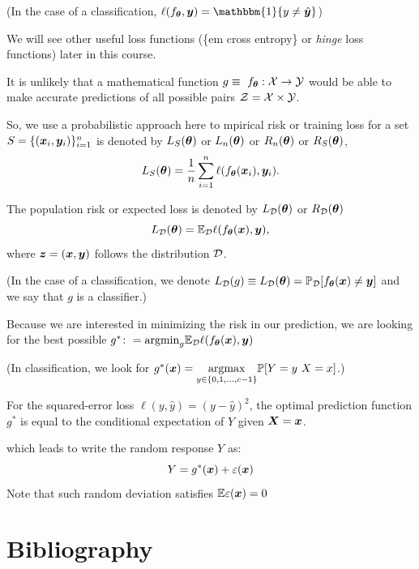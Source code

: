 \documentclass{beamer}
\begin{document}
\begin{frame}[allowframebreaks]
  (In the case of a classification, $\ell(f_{\vtheta},\vy)=\mathbbm{1}\{y\neq \hat{\vy}\}$)

We will see other useful loss functions (\{em cross entropy\} or {\em hinge} loss functions) later in this course.

It is unlikely that a mathematical function $g \equiv \ f_{\bm{\theta}}:\mathcal{X}\to\mathcal{Y}$ would be able to make accurate predictions of all possible pairs $\mathcal{Z}=\mathcal{X}\times\mathcal{Y}$.

  So, we use a probabilistic approach here to mpirical risk or training loss for a set $S=\{(\bm{x}_i,\bm{y}_i)\}_{i=1}^{n}$ is denoted by  $L_S(\bm{\theta})$ or $L_{n}(\bm{\theta})$ or $R_{n}(\bm{\theta})$ or $R_{S}(\bm{\theta})$,
  \begin{equation}
      L_S(\bm{\theta}) =\frac{1}{n}\sum_{i=1}^n\ell(f_{\bm{\theta}}(\bm{x}_i),\bm{y}_i).
  \end{equation}
  
  The population risk or expected loss is denoted by $L_{\mathcal{D}}(\bm{\theta})$ or $R_{\mathcal{D}}(\bm{\theta})$
  \begin{equation}
      L_{\mathcal{D}}(\bm{\theta}) =\mathbb{E}_{\mathcal{D}}\ell(f_{\bm{\theta}}(\bm{x}),\bm{y}),
  \end{equation}
  where $\bm{z}=(\bm{x},\bm{y})$ follows the distribution $\mathcal{D}$.
   
  (In the case of a classification, we denote $L_{\mathcal{D}}(g) \equiv L_{\mathcal{D}}(\bm{\theta}) = \mathbb{P}_{\mathcal{D}} [f_{\bm{\theta}}(\bm{x}) \neq \bm{y}]$ and we say that $g$ is a classifier.)

  Because we are interested in minimizing the risk in our prediction, we are looking for the best possible $g^* \colon = \mathrm{argmin}_g \mathbb{E}_{\mathcal{D}}\ell(f_{\bm{\theta}}(\bm{x}),\bm{y})$

  (In classification, we look for $g^* (\vx) = \underset{y\in\{0,1,\ldots,c-1\}}{\mathrm{argmax}}  \Prob[Y=y \ X=x]$.)

  \begin{theorem}
    For the squared-error loss $\ell (y,\hat{y})=(y-\hat{y})^2$, the optimal prediction function $g^*$ is equal to the conditional expectation of $Y$ given $\bm{X}=\bm{x}$.
  \end{theorem}
  which leads to write the random response $Y$ as:
  \[Y=g^*(\bm{x})+\varepsilon(\bm{x})\]
  Note that such random deviation satisfies $\mathbb{E} \varepsilon(\bm{x})=0$
\end{frame}


\section{Bibliography}


\end{document}
